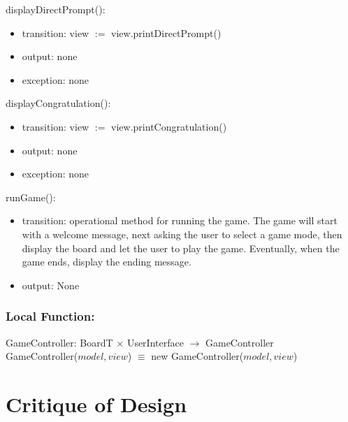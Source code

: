 \documentclass[12pt]{article}
\begin{document}
\noindent displayDirectPrompt():
\begin{itemize}
  \item transition: view $:=$ view.printDirectPrompt()
  \item output: none
  \item exception: none
\end{itemize}

\noindent displayCongratulation():
\begin{itemize}
  \item transition: view $:=$ view.printCongratulation()
  \item output: none
  \item exception: none
\end{itemize}

\noindent runGame():
\begin{itemize}
  \item transition: operational method for running the game. The game will start with a welcome message, next asking the user to select a game mode, then display the board and let the user to play the game. Eventually, when the game ends, display the ending message.
  \item output: None
\end{itemize}

\subsubsection*{Local Function:}

GameController: BoardT $\times$ UserInterface $\rightarrow$ GameController \\
GameController($model, view$) $\equiv$ new GameController($model, view$)

\newpage

\section*{Critique of Design}
\end{document}
